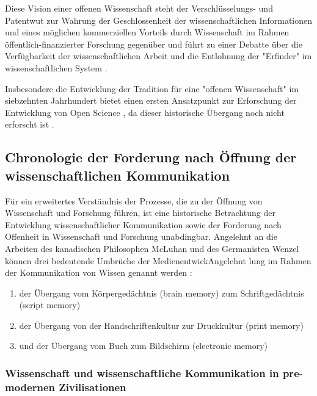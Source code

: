 Diese Vision einer offenen Wissenschaft steht der Verschlüsselungs- und Patentwut zur Wahrung der Geschlossenheit der wissenschaftlichen Informationen und eines möglichen kommerziellen Vorteils durch Wissenschaft im Rahmen öffentlich-finanzierter Forschung gegenüber und führt zu einer Debatte über die Verfügbarkeit der wissenschaftlichen Arbeit und die Entlohnung der "Erfinder" im wissenschaftlichen System \cite{suchen}.

Insbesondere die Entwicklung der Tradition für eine "offenen Wissenschaft" im siebzehnten Jahrhundert bietet einen ersten Ansatzpunkt zur Erforschung der Entwicklung von Open Science \cite{Scheliga_2014}, da dieser historische Übergang noch nicht erforscht ist \cite{CREATe_2014}.

\subsection{Chronologie der Forderung nach Öffnung der wissenschaftlichen Kommunikation}
Für ein erweitertes Verständnis der Prozesse, die zu der Öffnung von Wissenschaft und Forschung führen, ist eine historische Betrachtung der Entwicklung wissenschaftlicher Kommunikation sowie der Forderung nach Offenheit in Wissenschaft und Forschung unabdingbar. Angelehnt an die Arbeiten des kanadischen Philosophen McLuhan und des Germanisten Wenzel können drei bedeutende Umbrüche der MedienentwickAngelehnt lung im Rahmen der Kommunikation von Wissen \cite{wunderlich_2008_buchdruck} genannt werden  \cite{wenzel_mediengeschichte_2007}:
\begin{enumerate}
\item der Übergang vom Körpergedächtnis (brain memory) zum Schriftgedächtnis (script memory)
\item der Übergang von der Handschriftenkultur zur Druckkultur (print memory)
\item und der Übergang vom Buch zum Bildschirm (electronic memory)
\end{enumerate}

\subsubsection{Wissenschaft und wissenschaftliche Kommunikation in pre-modernen Zivilisationen}

